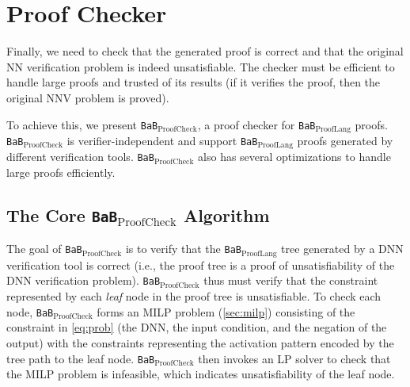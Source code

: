 \documentclass[oneside,11pt,dvipsnames]{book}
\numberwithin{equation}{section}
\theoremstyle{definition}
\theoremstyle{remark}
\newcommand{\prooflang}{\texttt{BaB$_{\text{ProofLang}}$}}
\newcommand{\proofcheck}{\texttt{BaB$_{\text{ProofCheck}}$}}
\begin{document}
\section{Proof Checker}\label{sec:proofchecking}
Finally, we need to check that the generated proof is correct and that the original NN verification problem is indeed unsatisfiable. The checker must be efficient to handle large proofs and trusted of its results (if it verifies the proof, then the original NNV problem is proved).


To achieve this, we present \proofcheck{}, a proof checker for \prooflang{} proofs.
\proofcheck{} is verifier-independent and support \prooflang{} proofs generated by different verification tools. \proofcheck{} also has several optimizations to handle large proofs efficiently.

\subsection{The Core \proofcheck{} Algorithm}


The goal of \proofcheck{} is to verify that the \prooflang{} tree generated by a DNN verification tool is correct (i.e., the proof tree is a proof of unsatisfiability of the DNN verification problem).
\proofcheck{} thus must verify that the constraint represented by each \emph{leaf} node in the proof tree is unsatisfiable. To check each node, \proofcheck{} forms an MILP problem (\autoref{sec:milp}) consisting of the constraint in \autoref{eq:prob} (the DNN, the input condition, and the negation of the output) with the constraints representing the activation pattern encoded by the tree path to the leaf node. \proofcheck{} then invokes an LP solver to check that the MILP problem is infeasible, which indicates unsatisfiability of the leaf node. 
\end{document}
